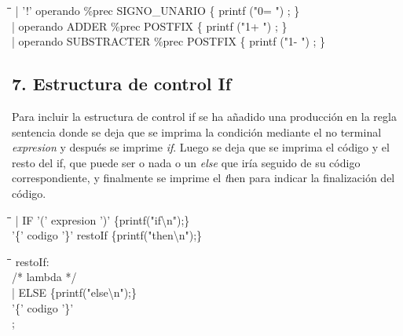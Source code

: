 \documentclass[11pt,spanish]{article}
\begin{document}
        \begin{tabbing}
            \hspace*{1cm}\=\hspace*{1cm}\= \hspace*{8cm}\=\kill
            \>| '!' operando \%prec SIGNO\_UNARIO\> \>  \{ printf ("0= ") ; \}\\
            \>| operando ADDER \%prec POSTFIX\> \>  \{ printf ("1+ ") ; \}\\
            \>| operando SUBSTRACTER \%prec POSTFIX\> \> \{ printf ("1- ") ; \}
        \end{tabbing}
        \subsection*{7. Estructura de control If}
        Para incluir la estructura de control if se ha añadido una producción en la regla {\ttfamily sentencia} donde se deja que se imprima la condición mediante el no terminal \textit {expresion} y después se imprime \textit {if}. Luego se deja que se imprima el código y el resto del if, que puede ser o nada o un \textit {else} que iría seguido de su código correspondiente, y finalmente se imprime el {\textit then} para indicar la finalización del código.
        \begin{tabbing}
            \hspace*{1cm}\=\hspace*{1cm}\= \hspace*{8cm}\=\kill
            \>| IF '(' expresion ')'\>\> \{printf("if\textbackslash n");\}\\
            \>\>'\{' codigo '\}' restoIf\> \{printf("then\textbackslash n");\}\\
        \end{tabbing}
        \begin{tabbing}
            \hspace*{1cm}\=\hspace*{1cm}\= \hspace*{8cm}\=\kill
            restoIf:\\
            \>/* lambda */ \\
            \>| ELSE\>\> \{printf("else\textbackslash n");\}\\
            \>'\{' codigo '\}'\\
            ;
		\end{tabbing}
\end{document}
